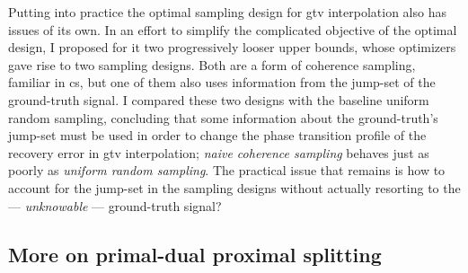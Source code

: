 Putting into practice the optimal sampling design for \acrshort{gtv} interpolation also has issues of its own. In an effort to simplify the complicated objective of the optimal design, I proposed for it two progressively looser upper bounds, whose optimizers gave rise to two sampling designs. Both are a form of coherence sampling, familiar in \acrlong{cs}, but one of them also uses information from the jump-set of the ground-truth signal. I compared these two designs with the baseline uniform random sampling, concluding that some information about the ground-truth's jump-set must be used in order to change the phase transition profile of the recovery error in \acrshort{gtv} interpolation; \emph{naive coherence sampling} behaves just as poorly as \emph{uniform random sampling}. The practical issue that remains is how to account for the jump-set in the sampling designs without actually resorting to the --- \emph{unknowable} --- ground-truth signal?

\clearpage

\begin{subappendices}
    \section{More on primal-dual proximal splitting}\label{ap:primal_dual_prox_split}
    
\end{subappendices}
